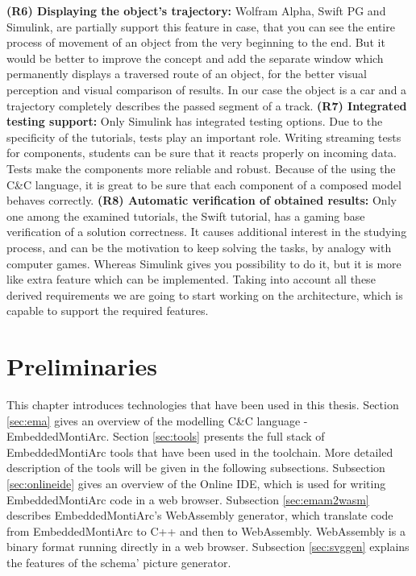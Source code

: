 \textbf{(R6) Displaying the object's trajectory:} Wolfram Alpha, Swift PG and Simulink, are partially support this feature in case, that you can see the entire process of movement of an object from the very beginning to the end. But it would be better to improve the concept and add the separate window which permanently displays a traversed route of an object, for the better visual perception and visual comparison of results. In our case the object is a car and a trajectory completely describes the passed segment of a track. \newline
\textbf{(R7) Integrated testing support:} Only Simulink has integrated testing options. Due to the specificity of the tutorials, tests play an important role. Writing streaming tests for components, students can be sure that it reacts properly on incoming data. Tests make the components more reliable and robust. Because of the using the C\&C language, it is great to be sure that each component of a composed model behaves correctly.\newline
\textbf{(R8) Automatic verification of obtained results:} Only one among the examined tutorials, the Swift tutorial, has a gaming base verification of a solution correctness. It causes additional interest in the studying process, and can be the motivation to keep solving the tasks, by analogy with computer games. Whereas Simulink gives you possibility to do it, but it is more like extra feature which can be implemented.\newline
Taking into account all these derived requirements we are going to start working on the architecture, which is capable to support the required features.\newline
\cleardoublepage

\chapter{Preliminaries} \label{sec:preliminaries}
This chapter introduces technologies that have been used in this thesis. Section \ref{sec:ema} gives an overview of the modelling C\&C language - EmbeddedMontiArc. Section \ref{sec:tools} presents the full stack of EmbeddedMontiArc tools that have been used in the toolchain. More detailed description of the tools will be given in the following subsections. Subsection \ref{sec:onlineide} gives an overview of the Online IDE, which is used for writing EmbeddedMontiArc code in a web browser. Subsection \ref{sec:emam2wasm} describes EmbeddedMontiArc's WebAssembly generator, which translate code from EmbeddedMontiArc to C++ and then to WebAssembly. WebAssembly is a binary format running directly in a web browser. Subsection \ref{sec:svggen} explains the features of the schema' picture generator.

